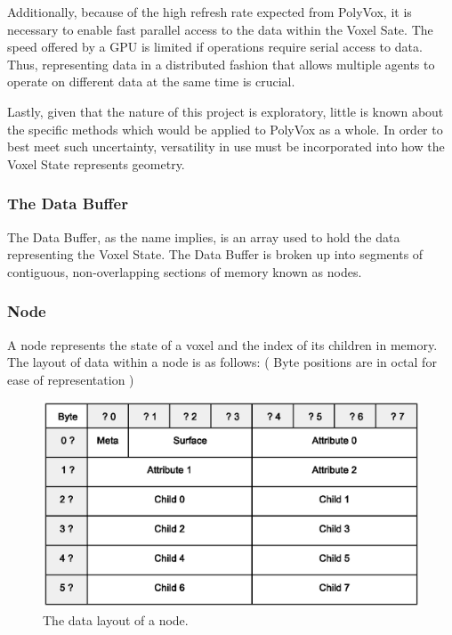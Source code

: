 \documentclass[onecolumn, draftclsnofoot,10pt, compsoc]{IEEEtran}
\begin{document}
Additionally, because of the high refresh rate expected from PolyVox, it is necessary to enable fast parallel access to the data within the Voxel Sate. The speed offered by a GPU is limited if operations require serial access to data. Thus, representing data in a distributed fashion that allows multiple agents to operate on different data at the same time is crucial.

Lastly, given that the nature of this project is exploratory, little is known about the specific methods which would be applied to PolyVox as a whole. In order to best meet such uncertainty, versatility in use must be incorporated into how the Voxel State represents geometry.

\subsubsection{The Data Buffer} 

The Data Buffer, as the name implies, is an array used to hold the data representing the Voxel State. The Data Buffer is broken up into segments of contiguous, non-overlapping sections of memory known as nodes.\\


\subsubsection{Node}

A node represents the state of a voxel and the index of its children in memory. The layout of data within a node is as follows: 
( Byte positions are in octal for ease of representation )\\

\begin{figure}[H]
\begin{center}
\includegraphics[width=\textwidth, viewport=50 120 475 380, clip=true]{nodeLayout.eps}
\caption{The data layout of a node.}
\end{center}
\end{figure}
\end{document}
